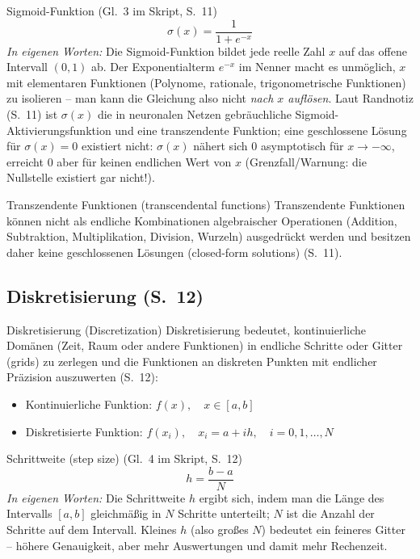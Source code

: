 \begin{satzbox}{Sigmoid-Funktion (Gl.~3 im Skript, S.~11)}
\[
\sigma(x) = \frac{1}{1 + e^{-x}}
\]
\emph{In eigenen Worten:} Die Sigmoid-Funktion bildet jede reelle Zahl $x$ auf das offene Intervall $(0,1)$ ab. Der Exponentialterm $e^{-x}$ im Nenner macht es unmöglich, $x$ mit elementaren Funktionen (Polynome, rationale, trigonometrische Funktionen) zu isolieren -- man kann die Gleichung also nicht \emph{nach $x$ auflösen}. Laut Randnotiz (S.~11) ist $\sigma(x)$ die in neuronalen Netzen gebräuchliche Sigmoid-Aktivierungsfunktion und eine transzendente Funktion; eine geschlossene Lösung für $\sigma(x) = 0$ existiert nicht: $\sigma(x)$ nähert sich $0$ asymptotisch für $x \to -\infty$, erreicht $0$ aber für keinen endlichen Wert von $x$ (Grenzfall/Warnung: die Nullstelle existiert gar nicht!).
\end{satzbox}

\begin{defbox}{Transzendente Funktionen (transcendental functions)}
Transzendente Funktionen können nicht als endliche Kombinationen algebraischer Operationen (Addition, Subtraktion, Multiplikation, Division, Wurzeln) ausgedrückt werden und besitzen daher keine geschlossenen Lösungen (closed-form solutions) (S.~11).
\end{defbox}

\subsection{Diskretisierung (S.~12)}

\begin{defbox}{Diskretisierung (Discretization)}
Diskretisierung bedeutet, kontinuierliche Domänen (Zeit, Raum oder andere Funktionen) in endliche Schritte oder Gitter (grids) zu zerlegen und die Funktionen an diskreten Punkten mit endlicher Präzision auszuwerten (S.~12):
\begin{itemize}[itemsep=0pt]
  \item Kontinuierliche Funktion: $f(x), \quad x \in [a, b]$
  \item Diskretisierte Funktion: $f(x_i), \quad x_i = a + ih, \quad i = 0, 1, \ldots, N$
\end{itemize}
\end{defbox}

\begin{satzbox}{Schrittweite (step size) (Gl.~4 im Skript, S.~12)}
\[
h = \frac{b-a}{N}
\]
\emph{In eigenen Worten:} Die Schrittweite $h$ ergibt sich, indem man die Länge des Intervalls $[a,b]$ gleichmäßig in $N$ Schritte unterteilt; $N$ ist die Anzahl der Schritte auf dem Intervall. Kleines $h$ (also großes $N$) bedeutet ein feineres Gitter -- höhere Genauigkeit, aber mehr Auswertungen und damit mehr Rechenzeit.
\end{satzbox}

